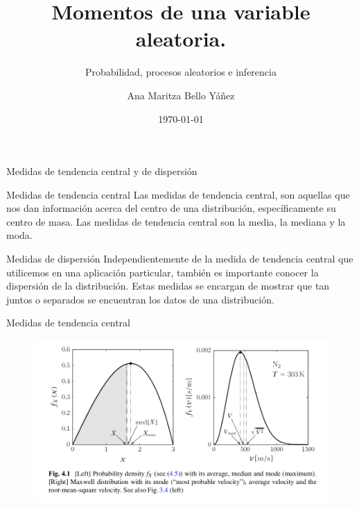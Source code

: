 \documentclass{beamer}
\title[ \hspace{21mm} \insertframenumber \ de \inserttotalframenumber ]
{Momentos de una variable aleatoria.}
\subtitle
{Probabilidad, procesos aleatorios e inferencia}
\author[]
{Ana Maritza Bello Yáñez}
\institute[Instituto Polit\'ecnico Nacional]
{
  \inst{1}
  Centro de Investigaci\'on en Computaci\'on
  }
\date[Short Occasion]
{\today}
\begin{document}
\begin{frame}
  \titlepage
\end{frame}

\begin{frame}{Medidas de tendencia central y de dispersión}
  \begin{block}{Medidas de tendencia central}
    Las medidas de tendencia central, son aquellas que nos dan información acerca del
    centro de una distribución, específicamente su centro de masa. Las medidas de
    tendencia central son la media, la mediana y la moda.
  \end{block}

  \begin{block}{Medidas de dispersión}
    Independientemente de la medida de tendencia central que utilicemos en una
    aplicación particular, también es importante conocer la dispersión de la
    distribución. Estas medidas se encargan de mostrar que tan juntos o separados se
    encuentran los datos de una distribución.
  \end{block}
\end{frame}

\begin{frame}{Medidas de tendencia central}
  \begin{figure}[h!]
    \centering
    \includegraphics[scale=0.41]{figures/mean_median_mode_sirca.png}
  \end{figure}
\end{frame}
\end{document}
